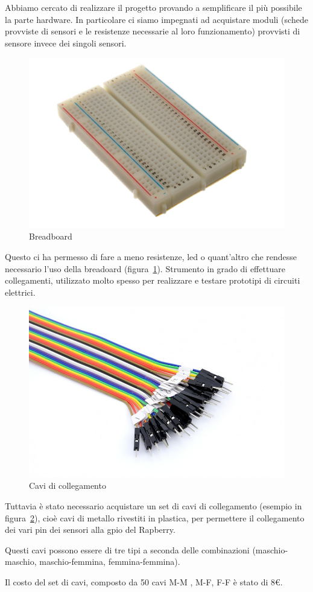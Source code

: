 Abbiamo cercato di realizzare il progetto provando a semplificare il più possibile la parte hardware.
In particolare ci siamo impegnati ad acquistare moduli (schede provviste di sensori e le resistenze necessarie al loro funzionamento) provvisti di sensore invece dei singoli sensori.

\begin{figure}
	\centering
	\includegraphics[width=0.7\linewidth]{Figures/Sensors&Rasp/breadboard}
	\caption[breadb]{Breadboard}
	\label{fig:bb}
	
\end{figure}

Questo ci ha permesso di fare a meno  resistenze, led o quant'altro che rendesse necessario l'uso della breadoard (figura~\ref{fig:bb}).
Strumento in grado di effettuare collegamenti, utilizzato molto spesso per realizzare e testare prototipi di circuiti elettrici.

\begin{figure}
	\centering
	\includegraphics[width=0.7\linewidth]{Figures/Sensors&Rasp/cables}
	\caption[cable]{Cavi di collegamento}
	\label{fig:cables}
	
\end{figure}

\newpage

Tuttavia è stato necessario acquistare un set di cavi di collegamento (esempio in figura~\ref{fig:cables}), cioè cavi di metallo rivestiti in plastica, per permettere il collegamento dei vari pin dei sensori alla gpio del Rapberry.
	
Questi cavi possono essere di tre tipi a seconda delle combinazioni (maschio-maschio, maschio-femmina, femmina-femmina).

Il costo del set di cavi, composto da 50 cavi M-M , M-F, F-F è stato di 8€.

\newpage

